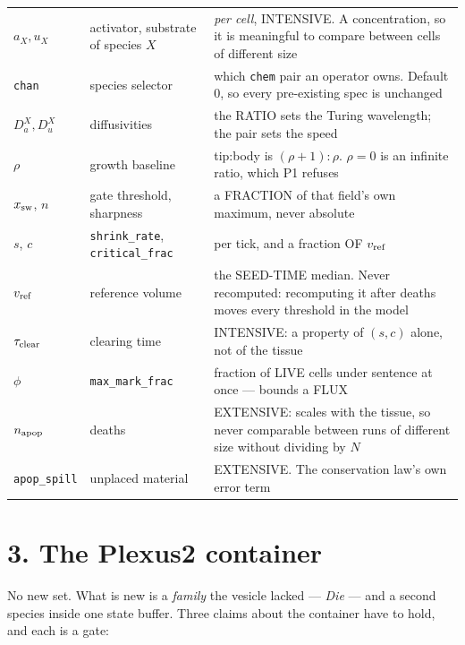\documentclass[10pt,a4paper]{article}
\newcommand{\code}[1]{\texttt{#1}}
\begin{document}
\smallskip
{\small
\begin{tabular}{@{}llp{8.4cm}@{}}\toprule
$a_X,u_X$ & activator, substrate of species $X$ & \emph{per cell}, INTENSIVE. A concentration, so it
  is meaningful to compare between cells of different size\\
\code{chan} & species selector & which \code{chem} pair an operator owns. Default 0, so every
  pre-existing spec is unchanged\\
$D^X_a,D^X_u$ & diffusivities & the RATIO sets the Turing wavelength; the pair sets the speed\\
$\rho$ & growth baseline & tip:body is $(\rho+1):\rho$. $\rho=0$ is an infinite ratio, which P1 refuses\\
$x_{\rm sw}$, $n$ & gate threshold, sharpness & a FRACTION of that field's own maximum, never absolute\\
$s$, $c$ & \code{shrink\_rate}, \code{critical\_frac} & per tick, and a fraction OF $v_{\rm ref}$\\
$v_{\rm ref}$ & reference volume & the SEED-TIME median. Never recomputed: recomputing it after
  deaths moves every threshold in the model\\
$\tau_{\rm clear}$ & clearing time & INTENSIVE: a property of $(s,c)$ alone, not of the tissue\\
$\phi$ & \code{max\_mark\_frac} & fraction of LIVE cells under sentence at once --- bounds a FLUX\\
$n_{\rm apop}$ & deaths & EXTENSIVE: scales with the tissue, so never comparable between runs of
  different size without dividing by $N$\\
\code{apop\_spill} & unplaced material & EXTENSIVE. The conservation law's own error term\\
\bottomrule
\end{tabular}}

\section*{3.\; The Plexus2 container}

No new set. What is new is a \emph{family} the vesicle lacked --- \emph{Die} --- and a second species
inside one state buffer. Three claims about the container have to hold, and each is a gate:
\end{document}
